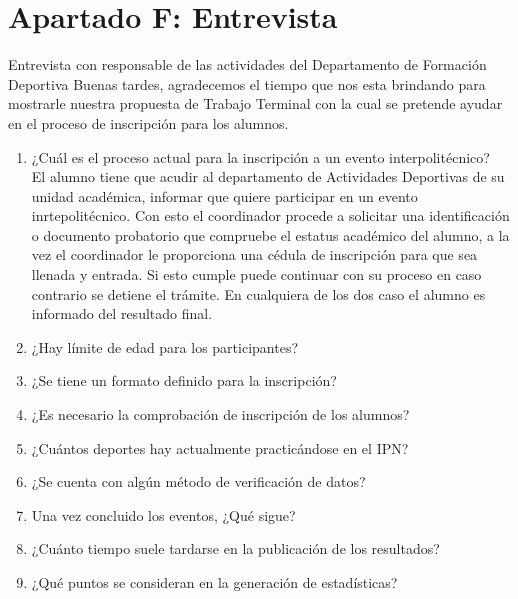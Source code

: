		
	
	\pagebreak
	
	\section{Apartado F: Entrevista}
		\noindent Entrevista con responsable de las actividades del Departamento de Formación Deportiva
		Buenas tardes, agradecemos el tiempo que nos esta brindando para mostrarle nuestra propuesta de Trabajo Terminal con la cual se pretende ayudar en el proceso de inscripción para los alumnos.
		\label{Entrevista}
		\begin{enumerate}
			\item ¿Cuál es el proceso actual para la inscripción a un evento interpolitécnico?\\
			El alumno tiene que acudir al departamento de Actividades Deportivas de su unidad académica, informar que quiere participar en un evento inrtepolitécnico. Con esto el coordinador procede a solicitar una identificación o documento probatorio que compruebe el estatus académico del alumno, a la vez el coordinador le proporciona una cédula de inscripción para que sea llenada y entrada. Si esto cumple puede continuar con su proceso en caso contrario se detiene el trámite. En cualquiera de los dos caso el alumno es informado del resultado final.
			
			\item ¿Hay límite de edad para los participantes?
			\item ¿Se tiene un formato definido para la inscripción?
			\item ¿Es necesario la comprobación de inscripción de los alumnos?
			\item ¿Cuántos deportes hay actualmente practicándose en el IPN?
			\item ¿Se cuenta con algún método de verificación de datos?
			\item Una vez concluido los eventos, ¿Qué sigue?
			\item ¿Cuánto tiempo suele tardarse en la publicación de los resultados?
			\item ¿Qué puntos se consideran en la generación de estadísticas?
		\end{enumerate} 
